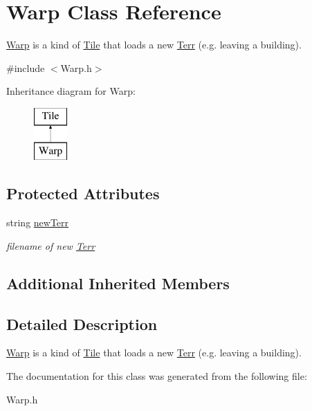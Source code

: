 \hypertarget{class_warp}{}\section{Warp Class Reference}
\label{class_warp}


\hyperlink{class_warp}{Warp} is a kind of \hyperlink{class_tile}{Tile} that loads a new \hyperlink{class_terr}{Terr} (e.\+g. leaving a building).  




{\ttfamily \#include $<$Warp.\+h$>$}

Inheritance diagram for Warp\+:\begin{figure}[H]
\begin{center}
\leavevmode
\includegraphics[height=2.000000cm]{class_warp}
\end{center}
\end{figure}
\subsection*{Protected Attributes}
\begin{DoxyCompactItemize}
\item 
string \hyperlink{class_warp_abbc0edf4c6a9939e0c39c9eb55b8fb1f}{new\+Terr}\hypertarget{class_warp_abbc0edf4c6a9939e0c39c9eb55b8fb1f}{}\label{class_warp_abbc0edf4c6a9939e0c39c9eb55b8fb1f}

\begin{DoxyCompactList}\small\item\em filename of new \hyperlink{class_terr}{Terr} \end{DoxyCompactList}\end{DoxyCompactItemize}
\subsection*{Additional Inherited Members}


\subsection{Detailed Description}
\hyperlink{class_warp}{Warp} is a kind of \hyperlink{class_tile}{Tile} that loads a new \hyperlink{class_terr}{Terr} (e.\+g. leaving a building). 

The documentation for this class was generated from the following file\+:\begin{DoxyCompactItemize}
\item 
Warp.\+h\end{DoxyCompactItemize}
